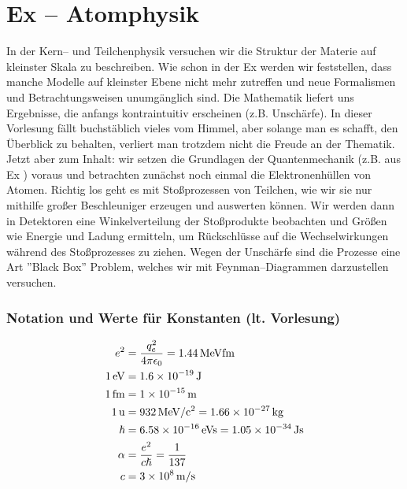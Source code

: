 \documentclass[Ex4_Zusammenfassung.tex]{subfiles}
\begin{document}
\chapter{ Ex  -- Atomphysik}

In der Kern-- und Teilchenphysik versuchen wir die Struktur der Materie auf kleinster Skala zu beschreiben. Wie schon in der Ex  werden wir feststellen, dass manche Modelle auf kleinster Ebene nicht mehr zutreffen und neue Formalismen und Betrachtungsweisen unumgänglich sind. Die Mathematik liefert uns Ergebnisse, die anfangs kontraintuitiv erscheinen (z.B. Unschärfe). In dieser Vorlesung fällt buchstäblich vieles vom Himmel, aber solange man es schafft, den Überblick zu behalten, verliert man trotzdem nicht die Freude an der Thematik.\\

Jetzt aber zum Inhalt: wir setzen die Grundlagen der Quantenmechanik (z.B. aus Ex ) voraus und betrachten zunächst noch einmal die Elektronenhüllen von Atomen. Richtig los geht es mit Stoßprozessen von Teilchen, wie wir sie nur mithilfe großer Beschleuniger erzeugen und auswerten können. Wir werden dann in Detektoren eine Winkelverteilung der Stoßprodukte beobachten und Größen wie Energie und Ladung ermitteln, um Rückschlüsse auf die Wechselwirkungen während des Stoßprozesses zu ziehen. Wegen der Unschärfe sind die Prozesse eine Art ''Black Box'' Problem, welches wir mit Feynman--Diagrammen darzustellen versuchen. 

\subsection*{Notation und Werte für Konstanten (lt. Vorlesung)}
\begin{align*}
	e^2 &= \frac{q_e^2}{4\pi \epsilon_{0}} = \SI{1.44}{MeV fm}  \\
	\SI{1}{eV} &= \SI{1.6E-19}{J}  \\
	\SI{1}{fm} &= \SI{1E-15}{m}\\ 
	\SI{1}{u} &=  \SI{932}{MeV/c^2} = \SI{1.66E-27}{kg} \\
	\hslash &= \SI{6.58E-16}{eV s}= \SI{1.05E-34}{Js} \\
	\alpha &= \frac {e^2}{c \hslash} = \frac{1}{137} \\
	c &= \SI{3E8}{m/s}
\end{align*} 
\end{document}
